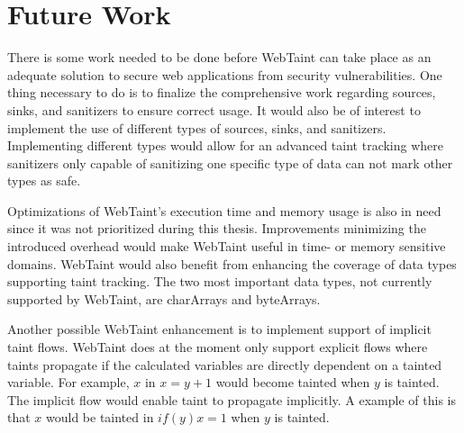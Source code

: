 \chapter{Future Work}
\label{FutureWork}
There is some work needed to be done before WebTaint can take place as an adequate solution to secure web applications from security vulnerabilities. One thing necessary to do is to finalize the comprehensive work regarding sources, sinks, and sanitizers to ensure correct usage. It would also be of interest to implement the use of different types of sources, sinks, and sanitizers. Implementing different types would allow for an advanced taint tracking where sanitizers only capable of sanitizing one specific type of data can not mark other types as safe. 

Optimizations of WebTaint's execution time and memory usage is also in need since it was not prioritized during this thesis. Improvements minimizing the introduced overhead would make WebTaint useful in time- or memory sensitive domains. WebTaint would also benefit from enhancing the coverage of data types supporting taint tracking. The two most important data types, not currently supported by WebTaint, are charArrays and byteArrays. 

Another possible WebTaint enhancement is to implement support of implicit taint flows. WebTaint does at the moment only support explicit flows where taints propagate if the calculated variables are directly dependent on a tainted variable. For example, $ x $ in $ x = y + 1 $ would become tainted when $ y $ is tainted. The implicit flow would enable taint to propagate implicitly. A example of this is that $ x $ would be tainted in $ if (y) x = 1 $ when $ y $ is tainted.